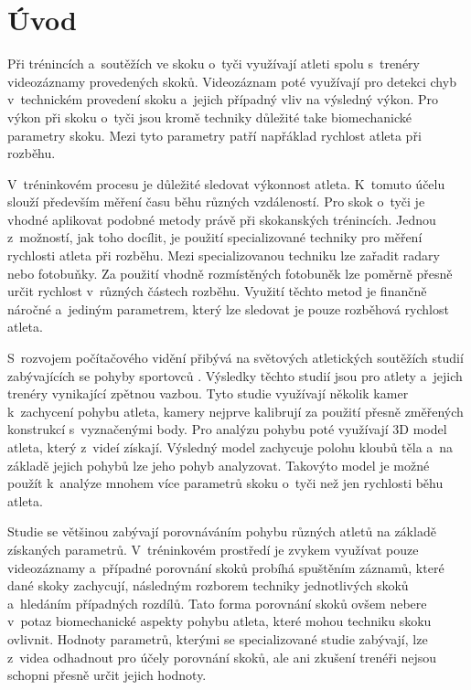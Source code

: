 \chapter*{Úvod}

Při trénincích a~soutěžích ve skoku o~tyči využívají atleti spolu s~trenéry videozáznamy provedených skoků. Videozáznam poté využívají pro detekci chyb v~technickém provedení skoku a~jejich případný vliv na výsledný výkon. Pro výkon při skoku o~tyči jsou kromě techniky důležité take biomechanické parametry skoku. Mezi tyto parametry patří napřáklad rychlost atleta při rozběhu.

V~tréninkovém procesu je důležité sledovat výkonnost atleta. K~tomuto účelu slouží především měření času běhu různých vzdáleností. Pro skok o~tyči je vhodné aplikovat podobné metody právě při skokanských trénincích. Jednou z~možností, jak toho docílit, je použití specializované techniky pro měření rychlosti atleta při rozběhu. Mezi specializovanou techniku lze zařadit radary nebo fotobuňky. Za použití vhodně rozmístěných fotobuněk lze poměrně přesně určit rychlost v~různých částech rozběhu. Využití těchto metod je finančně náročné a~jediným parametrem, který lze sledovat je pouze rozběhová rychlost atleta.

S~rozvojem počítačového vidění přibývá na světových atletických soutěžích studií zabývajících se pohyby sportovců \citep{IAAFBR}. Výsledky těchto studií jsou pro atlety a~jejich trenéry vynikající zpětnou vazbou. Tyto studie využívají několik kamer k~zachycení pohybu atleta, kamery nejprve kalibrují za použití přesně změřených konstrukcí s~vyznačenými body. Pro analýzu pohybu poté využívají 3D model atleta, který z~videí získají. Výsledný model zachycuje polohu kloubů těla a~na základě jejich pohybů lze jeho pohyb analyzovat. Takovýto model je možné použít k~analýze mnohem více parametrů skoku o~tyči než jen rychlosti běhu atleta.

Studie se většinou zabývají porovnáváním pohybu různých atletů na základě získaných parametrů. V~tréninkovém prostředí je zvykem využívat pouze videozáznamy a~případné porovnání skoků probíhá spuštěním záznamů, které dané skoky zachycují, následným rozborem techniky jednotlivých skoků a~hledáním případných rozdílů. Tato forma porovnání skoků ovšem nebere v~potaz biomechanické aspekty pohybu atleta, které mohou techniku skoku ovlivnit. Hodnoty parametrů, kterými se specializované studie zabývají, lze z~videa odhadnout pro účely porovnání skoků, ale ani zkušení trenéři nejsou schopni přesně určit jejich hodnoty.

